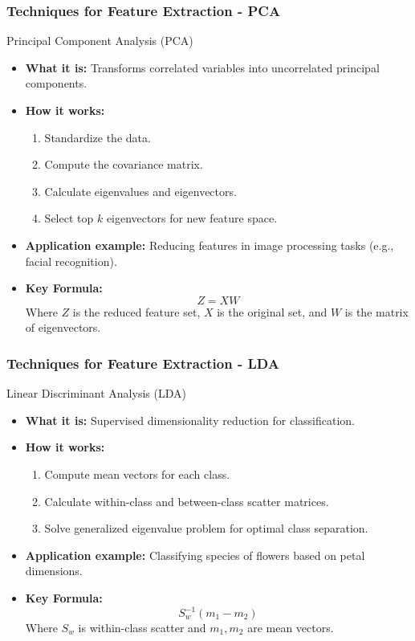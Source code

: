 \documentclass[aspectratio=169]{beamer}
\begin{document}
\begin{frame}[fragile]
    \frametitle{Techniques for Feature Extraction - PCA}
    \begin{block}{Principal Component Analysis (PCA)}
        \begin{itemize}
            \item \textbf{What it is:} Transforms correlated variables into uncorrelated principal components.
            \item \textbf{How it works:}
            \begin{enumerate}
                \item Standardize the data.
                \item Compute the covariance matrix.
                \item Calculate eigenvalues and eigenvectors.
                \item Select top \( k \) eigenvectors for new feature space.
            \end{enumerate}
            \item \textbf{Application example:} Reducing features in image processing tasks (e.g., facial recognition).
            \item \textbf{Key Formula:} 
            \[
            Z = XW
            \]
            Where \( Z \) is the reduced feature set, \( X \) is the original set, and \( W \) is the matrix of eigenvectors.
        \end{itemize}
    \end{block}
\end{frame}

\begin{frame}[fragile]
    \frametitle{Techniques for Feature Extraction - LDA}
    \begin{block}{Linear Discriminant Analysis (LDA)}
        \begin{itemize}
            \item \textbf{What it is:} Supervised dimensionality reduction for classification.
            \item \textbf{How it works:}
            \begin{enumerate}
                \item Compute mean vectors for each class.
                \item Calculate within-class and between-class scatter matrices.
                \item Solve generalized eigenvalue problem for optimal class separation.
            \end{enumerate}
            \item \textbf{Application example:} Classifying species of flowers based on petal dimensions.
            \item \textbf{Key Formula:} 
            \[
            S_w^{-1}(m_1 - m_2)
            \]
            Where \( S_w \) is within-class scatter and \( m_1, m_2 \) are mean vectors.
        \end{itemize}
    \end{block}
\end{frame}
\end{document}

